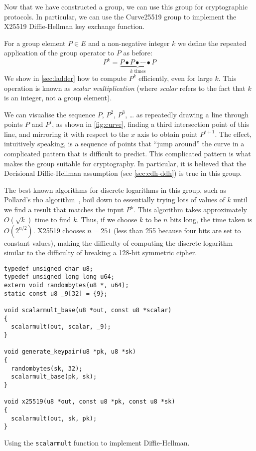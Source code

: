 \documentclass[manuscript]{acmart}
\begin{document}
Now that we have constructed a group, we can use this group for cryptographic protocols.
In particular, we can use the Curve25519 group to implement the X25519 Diffie-Hellman key exchange function.

For a group element $P \in E$ and a non-negative integer $k$ we define the repeated application of the group operator to $P$ as before:
\begin{equation}
P^k = \underbrace{P \bullet P \bullet \cdots \bullet P}_\text{$k$ times}
\end{equation}
We show in \autoref{sec:ladder} how to compute $P^k$ efficiently, even for large $k$.
This operation is known as \emph{scalar multiplication} (where \emph{scalar} refers to the fact that $k$ is an integer, not a group element).

We can visualise the sequence $P$, $P^2$, $P^3$, {\dots} as repeatedly drawing a line through points $P$ and $P^i$, as shown in \autoref{fig:curve}, finding a third intersection point of this line, and mirroring it with respect to the $x$ axis to obtain point $P^{i+1}$.
The effect, intuitively speaking, is a sequence of points that ``jump around'' the curve in a complicated pattern that is difficult to predict.
This complicated pattern is what makes the group suitable for cryptography.
In particular, it is believed that the Decisional Diffie-Hellman assumption (see \autoref{sec:cdh-ddh}) is true in this group.

The best known algorithms for discrete logarithms in this group, such as Pollard's rho algorithm~\cite{Pollard:1978do}, boil down to essentially trying lots of values of $k$ until we find a result that matches the input $P^k$.
This algorithm takes approximately $O(\sqrt{k})$ time to find $k$.
Thus, if we choose $k$ to be $n$ bits long, the time taken is $O(2^{n/2})$.
X25519 chooses $n=251$ (less than 255 because four bits are set to constant values), making the difficulty of computing the discrete logarithm similar to the difficulty of breaking a 128-bit symmetric cipher.

\begin{listing}
\begin{verbatim}
typedef unsigned char u8;
typedef unsigned long long u64;
extern void randombytes(u8 *, u64);
static const u8 _9[32] = {9};

void scalarmult_base(u8 *out, const u8 *scalar)
{ 
  scalarmult(out, scalar, _9);
}

void generate_keypair(u8 *pk, u8 *sk)
{
  randombytes(sk, 32);
  scalarmult_base(pk, sk);
}

void x25519(u8 *out, const u8 *pk, const u8 *sk)
{
  scalarmult(out, sk, pk);
}
\end{verbatim}
\caption{Using the \texttt{scalarmult} function to implement Diffie-Hellman.}\label{code:diffie-hellman}
\end{listing}
\end{document}
